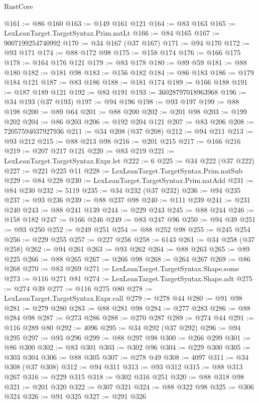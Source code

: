 \begin{lexlean}{RustCore}
\begin{coremodule}
@161 := @86 @160
@163 := @149 @161 @121
@164 := @83 @163
@165 := LexLeanTarget.TargetSyntax.Prim.natLt
@166 := @84 @165
@167 := 9007199254740992
@170 := @34 @167 (@37 @167)
@171 := @94 @170
@172 := @93 @171
@174 := @88 @172 @98
@175 := @158 @174
@176 := @166 @175
@178 := @164 @176 @121
@179 := @83 @178
@180 := @89 @59
@181 := @88 @180
@182 := @181 @98
@183 := @156 @182
@184 := @86 @183
@186 := @179 @184 @121
@187 := @83 @186
@188 := @181 @174
@189 := @166 @188
@191 := @187 @189 @121
@192 := @83 @191
@193 := 36028797018963968
@196 := @34 @193 (@37 @193)
@197 := @94 @196
@198 := @93 @197
@199 := @88 @198
@200 := @89 @64
@201 := @88 @200
@202 := @201 @98
@203 := @199 @202
@204 := @86 @203
@206 := @192 @204 @121
@207 := @83 @206
@208 := 72057594037927936
@211 := @34 @208 (@37 @208)
@212 := @94 @211
@213 := @93 @212
@215 := @88 @213 @98
@216 := @201 @215
@217 := @166 @216
@219 := @207 @217 @121
@220 := @83 @219
@221 := LexLeanTarget.TargetSyntax.Expr.let
@222 := 6
@225 := @34 @222 (@37 @222)
@227 := @221 @225 @11
@228 := LexLeanTarget.TargetSyntax.Prim.natSub
@229 := @84 @228
@230 := LexLeanTarget.TargetSyntax.Prim.natAdd
@231 := @84 @230
@232 := 5119
@235 := @34 @232 (@37 @232)
@236 := @94 @235
@237 := @93 @236
@239 := @88 @237 @98
@240 := @111 @239
@241 := @231 @240
@243 := @88 @241 @139
@244 := @229 @243
@245 := @88 @244
@246 := @158 @182
@247 := @166 @246
@249 := @83 @247 @96
@250 := @94 @39
@251 := @93 @250
@252 := @249 @251
@254 := @88 @252 @98
@255 := @245 @254
@256 := @229 @255
@257 := @227 @256
@258 := 6143
@261 := @34 @258 (@37 @258)
@262 := @94 @261
@263 := @93 @262
@264 := @88 @263
@265 := @89 @225
@266 := @88 @265
@267 := @266 @98
@268 := @264 @267
@269 := @86 @268
@270 := @83 @269
@271 := LexLeanTarget.TargetSyntax.Shape.some
@273 := @116 @271 @81
@274 := LexLeanTarget.TargetSyntax.Shape.adt
@275 := @274 @39
@277 := @116 @275 @80
@278 := LexLeanTarget.TargetSyntax.Expr.call
@279 := @278 @44
@280 := @91 @98
@281 := @279 @280
@283 := @88 @281 @98
@284 := @277 @283
@286 := @88 @284 @98
@287 := @273 @286
@288 := @270 @287
@289 := @274 @44
@291 := @116 @289 @80
@292 := 4096
@295 := @34 @292 (@37 @292)
@296 := @94 @295
@297 := @93 @296
@299 := @88 @297 @98
@300 := @266 @299
@301 := @86 @300
@302 := @83 @301
@303 := @302 @96
@304 := @229 @300
@305 := @303 @304
@306 := @88 @305
@307 := @278 @49
@308 := 4097
@311 := @34 @308 (@37 @308)
@312 := @94 @311
@313 := @93 @312
@315 := @88 @313 @267
@316 := @229 @315
@318 := @302 @316 @251
@320 := @88 @318 @98
@321 := @201 @320
@322 := @307 @321
@324 := @88 @322 @98
@325 := @306 @324
@326 := @91 @325
@327 := @291 @326

\end{coremodule}
\end{lexlean}
